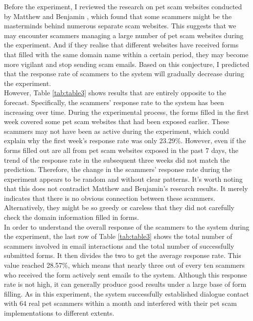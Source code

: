 \documentclass[ oneside,%
                    author={Cassie Qing Tang},
                    degree={BSc},
                     title={An Automated Response System for Disrupting Online Pet Scamming \\ },
                    subtitle={ }]{dissertation}
\begin{document}
Before the experiment, I reviewed the research on pet scam websites conducted by Matthew and Benjamin \cite{price_resource_2020}, which found that some scammers might be the masterminds behind numerous separate scam websites. This suggests that we may encounter scammers managing a large number of pet scam websites during the experiment. And if they realise that different websites have received forms that filled with the same domain name within a certain period, they may become more vigilant and stop sending scam emails. Based on this conjecture, I predicted that the response rate of scammers to the system will gradually decrease during the experiment.
\\

However, Table \ref{tab:table3} shows results that are entirely opposite to the forecast. Specifically, the scammers' response rate to the system has been increasing over time. During the experimental process, the forms filled in the first week covered some pet scam websites that had been exposed earlier. These scammers may not have been as active during the experiment, which could explain why the first week's response rate was only 23.29\%. However, even if the forms filled out are all from pet scam websites exposed in the past 7 days, the trend of the response rate in the subsequent three weeks did not match the prediction. Therefore, the change in the scammers’ response rate during the experiment appears to be random and without clear patterns. It's worth noting that this does not contradict Matthew and Benjamin's research results. It merely indicates that there is no obvious connection between these scammers. Alternatively, they might be so greedy or careless that they did not carefully check the domain information filled in forms.
\\

In order to understand the overall response of the scammers to the system during the experiment, the last row of Table \ref{tab:table3} shows the total number of scammers involved in email interactions and the total number of successfully submitted forms. It then divides the two to get the average response rate. This value reached 28.57\%, which means that nearly three out of every ten scammers who received the form actively sent emails to the system. Although this response rate is not high, it can generally produce good results under a large base of form filling. As in this experiment, the system successfully established dialogue contact with 64 real pet scammers within a month and interfered with their pet scam implementations to different extents.
\end{document}
